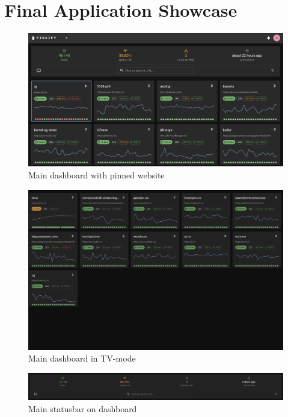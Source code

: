 \section{Final Application Showcase}
\label{app:final_app_showcase}

\begin{figure}
    \centering
    \includegraphics[width=1\linewidth]{figures/main_dashboard.png}
    \caption{Main dashboard with pinned website}
    \label{fig:app_final_dashboard}
\end{figure}

\begin{figure}
    \centering
    \includegraphics[width=1\linewidth]{figures/tv-mode.png}
    \caption{Main dashboard in TV-mode}
    \label{fig:app_tv_mode}
\end{figure}

\begin{figure}
    \centering
    \includegraphics[width=1\linewidth]{figures/final_application/final_statusbar.png}
    \caption{Main statusbar on dashboard}
    \label{fig:app_tv_mode}
\end{figure}

